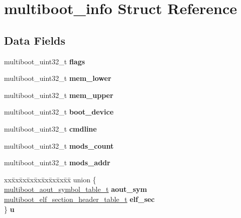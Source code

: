 \hypertarget{structmultiboot__info}{}\section{multiboot\+\_\+info Struct Reference}
\label{structmultiboot__info}
\subsection*{Data Fields}
\begin{DoxyCompactItemize}
\item 
multiboot\+\_\+uint32\+\_\+t {\bfseries flags}\hypertarget{structmultiboot__info_aa562865bc325fd785c9fa4c5056294f3}{}\label{structmultiboot__info_aa562865bc325fd785c9fa4c5056294f3}

\item 
multiboot\+\_\+uint32\+\_\+t {\bfseries mem\+\_\+lower}\hypertarget{structmultiboot__info_aa3503176ee0d132ef98537fa0b36ff09}{}\label{structmultiboot__info_aa3503176ee0d132ef98537fa0b36ff09}

\item 
multiboot\+\_\+uint32\+\_\+t {\bfseries mem\+\_\+upper}\hypertarget{structmultiboot__info_a87db5803d5a79490b2bf32cb8e9a05c9}{}\label{structmultiboot__info_a87db5803d5a79490b2bf32cb8e9a05c9}

\item 
multiboot\+\_\+uint32\+\_\+t {\bfseries boot\+\_\+device}\hypertarget{structmultiboot__info_ac7dd626a05c9ba62d55ea8a7a254de80}{}\label{structmultiboot__info_ac7dd626a05c9ba62d55ea8a7a254de80}

\item 
multiboot\+\_\+uint32\+\_\+t {\bfseries cmdline}\hypertarget{structmultiboot__info_a0f2f05f69c69c615bf2b4820d357cf36}{}\label{structmultiboot__info_a0f2f05f69c69c615bf2b4820d357cf36}

\item 
multiboot\+\_\+uint32\+\_\+t {\bfseries mods\+\_\+count}\hypertarget{structmultiboot__info_aebdafce31f94277d138202f7b1ec35cc}{}\label{structmultiboot__info_aebdafce31f94277d138202f7b1ec35cc}

\item 
multiboot\+\_\+uint32\+\_\+t {\bfseries mods\+\_\+addr}\hypertarget{structmultiboot__info_a854bdbfa7b23c9c3dfa0bfc155ef8242}{}\label{structmultiboot__info_a854bdbfa7b23c9c3dfa0bfc155ef8242}

\item 
\begin{tabbing}
xx\=xx\=xx\=xx\=xx\=xx\=xx\=xx\=xx\=\kill
union \{\\
\>\hyperlink{structmultiboot__aout__symbol__table}{multiboot\_aout\_symbol\_table\_t} {\bfseries aout\_sym}\\
\>\hyperlink{structmultiboot__elf__section__header__table}{multiboot\_elf\_section\_header\_table\_t} {\bfseries elf\_sec}\\
\} {\bfseries u}\hypertarget{structmultiboot__info_a61dc20144c958a07801f479c74e5867e}{}\label{structmultiboot__info_a61dc20144c958a07801f479c74e5867e}
\\


\end{tabbing}
\end{DoxyCompactItemize}
